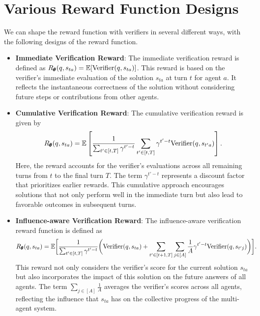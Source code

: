 \section{Various Reward Function Designs} 
\label{appendix_reward}
{We can shape the reward function with verifiers in several different ways, with the following designs of the reward function.} 


\begin{itemize}
    \item \textbf{Immediate Verification Reward}: The immediate verification reward is defined as \( R_{\pmb{\theta}} (q, s_{ta}) = \mathbb{E}[\text{Verifier}(q, s_{ta})] \). This reward is based on the verifier's immediate evaluation of the solution \( s_{ta} \) at turn \( t \) for agent \( a \). It reflects the instantaneous correctness of the solution without considering future steps or contributions from other agents.

    \item \textbf{Cumulative Verification Reward}: The cumulative verification reward is given by 
    \begin{align}\label{def:cum-veri-reward}
    R_{\pmb{\theta}} (q, s_{ta}) = \mathbb{E}\left[ \frac{1}{\sum_{t' \in [t, T]} \gamma^{t'-t}} \sum_{t' \in [t, T]} \gamma^{t'-t}\text{Verifier}(q, s_{t'a})\right].
    \end{align}
    Here, the reward accounts for the verifier's evaluations across all remaining turns from \( t \) to the final turn \( T \). The term \( \gamma^{t'-t} \) represents a discount factor that prioritizes earlier rewards. This cumulative approach encourages solutions that not only perform well in the immediate turn but also lead to favorable outcomes in subsequent turns.

    \item \textbf{Influence-aware Verification Reward}: The influence-aware verification reward function is defined as 
\begin{align*}
    &R_{\pmb{\theta}}(q, s_{ta}) = \mathbb{E} \bigg[\frac{1}{\sum_{t' \in [t, T]} \gamma^{t'-t}} \biggl( \text{Verifier}(q, s_{ta})+ \sum_{t' \in [t+1, T]}\sum_{j \in [A]} \frac{1}{A}\gamma^{t'-t}\text{Verifier}(q, s_{t'j})\biggr) \bigg].  
\end{align*}
    This reward not only considers the verifier's score for the current solution \( s_{ta} \) but also incorporates the impact of this solution on the future answers of all agents. The term \( \sum_{j \in [A]} \frac{1}{A} \) averages the verifier's scores across all agents, reflecting the influence that \( s_{ta} \) has on the collective progress of the multi-agent system.
\end{itemize}